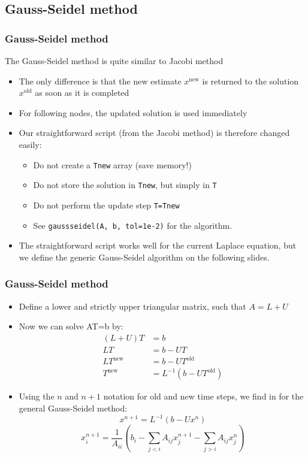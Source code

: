 \subsection*{Gauss-Seidel method}
\begin{frame}[fragile]
  \frametitle{Gauss-Seidel method}
  The Gauss-Seidel method is quite similar to Jacobi method
  \begin{itemize}
   \item The only difference is that the new estimate $x^\text{new}$ is returned to the solution $x^\text{old}$ as soon as it is completed
   \item For following nodes, the updated solution is used immediately \pause
   \item Our straightforward script (from the Jacobi method) is therefore changed easily:
   \begin{itemize}
    \item Do not create a \lstinline$Tnew$ array (save memory!)
    \item Do not store the solution in \lstinline$Tnew$, but simply in \lstinline$T$
    \item Do not perform the update step \lstinline$T=Tnew$
    \item See \lstinline$gaussseidel(A, b, tol=1e-2)$ for the algorithm.\pause
   \end{itemize}
   \item The straightforward script works well for the current Laplace equation, but we define the generic Gauss-Seidel algorithm on the following slides.
  \end{itemize}
\end{frame}

\begin{frame}[fragile]
  \frametitle{Gauss-Seidel method}
  \begin{itemize}
    \item Define a lower and strictly upper triangular matrix, such that $A = L + U$
    \item Now we can solve AT=b by:
    \begin{align*}
      (L+U)T &= b \\
      LT &= b - UT \\
      LT^\text{new} &= b - UT^\text{old} \\
      T^\text{new} &= L^{-1}(b-UT^\text{old})
   \end{align*}
     \item Using the $n$ and $n+1$ notation for old and new time steps, we find in for the general Gauss-Seidel method:
     \[
      x^{n+1} = L^{-1}\left(b-Ux^n\right)
     \]
     \[
      x_i^{n+1} = \frac{1}{A_{ii}}\left(b_i - \sum_{j<i} A_{ij}x_j^{n+1}- \sum_{j>i} A_{ij}x_j^n\right)
     \]
  \end{itemize}
\end{frame}

